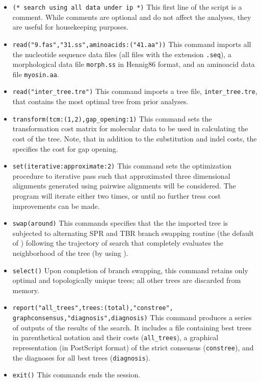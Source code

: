 \begin{itemize}
\item \texttt{(* search using all data under ip *)} This first line of the script is a comment. While comments are 
optional and do not affect the analyses, they are useful for housekeeping purposes.
\item \texttt{read("9.fas","31.ss",aminoacids:("41.aa"))} This command imports all the nucleotide sequence 
data files (all files with the extension \texttt{.seq}), a morphological data file \texttt{morph.ss} in Hennig86 format, 
and an aminoacid data file \texttt{myosin.aa}.
\item \texttt{read("inter\_tree.tre")} This command imports a tree file, \texttt{inter\_tree.tre}, that contains the most 
optimal tree from prior analyses. 
\item \texttt{transform(tcm:(1,2),gap\_opening:1)} This command sets the transformation cost matrix for molecular 
data to be used in calculating the cost of the tree. Note, that in addition to the substitution and indel costs, the 
 specifies the cost for gap opening.
\item \texttt{set(iterative:approximate:2)} This command sets the optimization procedure
    to iterative pass such that approximated three dimensional alignments generated using pairwise alignments 
    will be considered.  The program will iterate either two times, or until no further tress cost improvements can 
    be made.
\item \texttt{swap(around)} This commands specifies that the the imported tree is subjected to alternating SPR 
and TBR branch swapping routine (the default of \poy) following the trajectory of search that completely 
evaluates the neighborhood of the tree (by using ).
\item \texttt{select()} Upon completion of branch swapping, this command retains only optimal and topologically 
unique trees; all other trees are discarded from memory.
\item \texttt{report("all\_trees",trees:(total),"constree",\\graphconsensus,"diagnosis",diagnosis)} This command 
produces a series of outputs of the results of the search. It includes a file containing best trees in parenthetical 
notation and their costs (\texttt{all\_trees}), a graphical representation (in PostScript format) of the strict 
consensus (\texttt{constree}), and the diagnoses for all best trees (\texttt{diagnosis}).
\item \texttt{exit()} This commands ends the \poy session.
\end{itemize}

